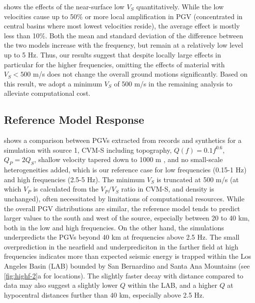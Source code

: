  shows the effects of the near-surface low $V_S$ quantitatively. While the low velocities cause up to 50\% or more local amplification in PGV (concentrated in central basins where most lowest velocities reside), the average effect is mostly less than 10\%. Both the mean and standard deviation of the difference between the two models increase with the frequency, but remain at a relatively low level up to 5 Hz. Thus, our results suggest that despite locally large effects in particular for the higher frequencies, omitting the effects of material with $V_S < 500$ m/s does not change the overall ground motions significantly. Based on this result, we adopt a minimum $V_S$ of 500 m/s in the remaining analysis to alleviate computational cost.


\subsection{Reference Model Response}
 shows a comparison between PGVs extracted from records and synthetics for a simulation with source 1, CVM-S including topography, $Q(f)=0.1f^{0.6}$, $Q_P=2Q_S$, shallow velocity tapered down to 1000 m \citep{huCalibrationNearsurfaceSeismic2021}, and no small-scale heterogeneities added, which is our reference case for low frequencies (0.15-1 Hz) and high frequencies (2.5-5 Hz). The minimum $V_S$ is truncated at 500 m/s (at which $V_P$ is calculated from the $V_P/V_S$ ratio in CVM-S, and density is unchanged), often necessitated by limitations of computational resources. While the overall PGV distributions are similar, the reference model tends to predict larger values to the south and west of the source, especially between 20 to 40 km, both in the low and high frequencies. On the other hand, the simulations underpredicts the PGVs beyond 40 km at frequencies above 2.5 Hz. The small overprediction in the nearfield and underprediciton in the farther field at high frequencies indicates more than expected seismic energy is trapped within the Los Angeles Basin (LAB) bounded by San Bernardino and Santa Ana Mountains (see \cref{fig:highf-2}a for locations). The slightly faster decay with distance compared to data may also suggest a slightly lower $Q$ within the LAB, and a higher $Q$ at hypocentral distances further than 40 km, especially above 2.5 Hz.

